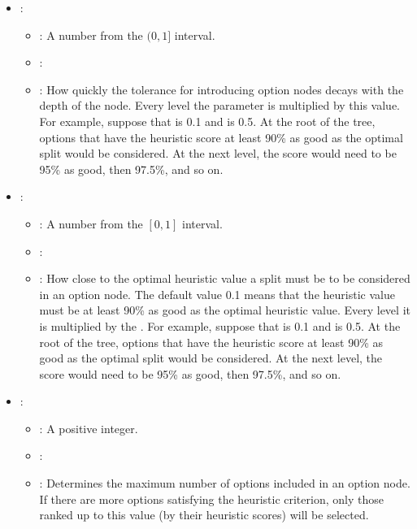 \begin{itemize}
    \item {}:
           \begin{itemize}
                \item \optionPossibleValues{}: A number from the $(0,1]$ interval.
                \item \optionDefaultValue{}: 
                \item \optionDescrption{}: How quickly the tolerance for introducing option nodes decays with the depth of the node. Every level the  parameter is multiplied by this value. For example, suppose that  is 0.1 and  is 0.5. At the root of the tree, options that have the heuristic score at least 90\% as good as the optimal split would be considered. At the next level, the score would need to be 95\% as good, then 97.5\%, and so on.
           \end{itemize}
    \item {}:
           \begin{itemize}
                \item \optionPossibleValues{}: A number from the $[0,1]$ interval.
                \item \optionDefaultValue{}: 
                \item \optionDescrption{}: How close to the optimal heuristic value a split must be to be considered in an option node. The default value 0.1 means that the heuristic value must be at least 90\% as good as the optimal heuristic value. Every level it is multiplied by the . For example, suppose that  is 0.1 and  is 0.5. At the root of the tree, options that have the heuristic score at least 90\% as good as the optimal split would be considered. At the next level, the score would need to be 95\% as good, then 97.5\%, and so on.
           \end{itemize}
    \item {}:
           \begin{itemize}
                \item \optionPossibleValues{}: A positive integer.
                \item \optionDefaultValue{}: 
                \item \optionDescrption{}: Determines the maximum number of options included in an option node. If there are more options satisfying the heuristic criterion, only those ranked up to this value (by their heuristic scores) will be selected.

\end{itemize}
\end{itemize}
